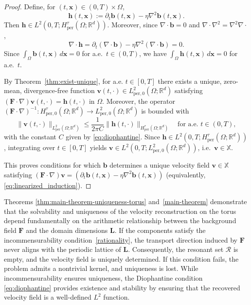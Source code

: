 \documentclass[12pt]{article}
\begin{document}
\begin{proof}
Define, for $(t,\boldsymbol x)\in(0,T)\times\Omega$,
\[
\boldsymbol h(t,\boldsymbol x)
:= \partial_t \boldsymbol b(t,\boldsymbol x)-\eta \nabla^2 \boldsymbol b(t,\boldsymbol x).
\]
Then $\boldsymbol h\in L^2(0,T;H^{\tau}_{\mathrm{per}}(\Omega; \mathbb{R}^d))$. Moreover, since $\nabla\cdot \boldsymbol b=0$ and
$\nabla\cdot\nabla^2=\nabla^2\nabla\cdot$,
\[
\nabla\cdot \boldsymbol h
=\partial_t(\nabla\cdot \boldsymbol b)-\eta \nabla^2(\nabla\cdot \boldsymbol b)=0.
\]
Since $\int_{\Omega}\boldsymbol b(t,\boldsymbol x)\,d\boldsymbol x=0$ for a.e.\ $t\in(0,T)$, we have $\int_{\Omega}\boldsymbol h(t,\boldsymbol x)\,d\boldsymbol x=0$ for a.e.\ $t$.

By Theorem~\ref{thm:exist-unique}, for a.e. $t\in[0,T]$ there exists a unique,
zero-mean, divergence-free function $\boldsymbol v(t,\cdot)\in L^2_{\mathrm{per},0}(\Omega; \mathbb{R}^d)$ satisfying
${{} (\mathbf{F}\cdot\nabla)\boldsymbol v(t,\cdot)=\boldsymbol h(t,\cdot)\textrm{ in }\Omega}$.
Moreover, the operator $(\boldsymbol{F}\cdot \nabla)^{-1}:H^{\tau}_{\textrm{per},0}(\Omega; \mathbb{R}^d)\rightarrow L^2_{\textrm{per},0}(\Omega; \mathbb{R}^d)$ is bounded with
\[
\|\boldsymbol v(t,\cdot)\|_{L^2_{\mathrm{per}}(\Omega; \mathbb{R}^d)} \le \frac{1}{2\pi C} \|\boldsymbol h(t,\cdot)\|_{H^\tau_{\mathrm{per}}(\Omega; \mathbb{R}^d)}
\quad\textrm{for a.e. }t\in(0,T),
\]
with the constant $C$ given by \eqref{eq:diophantine}.
Since $\boldsymbol h\in L^2(0,T;H^\tau_{\mathrm{per}}(\Omega; \mathbb{R}^d))$, integrating over $t\in[0,T]$ yields $\boldsymbol v\in L^2(0,T;L^2_{\mathrm{per},0}(\Omega; \mathbb{R}^d))$,
i.e.\ $\boldsymbol v\in\mathbb X$.

\medskip
This proves conditions for which $\boldsymbol b$ determines a unique velocity field $\boldsymbol v\in\mathbb X$
satisfying ${{} (\mathbf{F}\cdot\nabla)\boldsymbol v = (\partial_t \boldsymbol b(t,\boldsymbol x)-\eta \nabla^2 \boldsymbol b(t,\boldsymbol x))}$ (equivalently, \eqref{eq:linearized_induction}).
\end{proof}


 Theorems \ref{thm:main-theorem-uniqueness-torus} and~\ref{main-theorem} demonstrate that the solvability and uniqueness of the velocity reconstruction on the torus depend fundamentally on the arithmetic relationship between the background field $\mathbf{F}$ and the domain dimensions $\boldsymbol{L}$. If the components satisfy the incommensurability condition~\eqref{rationality}, the transport direction induced by $\mathbf{F}$ never aligns with the periodic lattice of $\boldsymbol{L}$. Consequently, the resonant set $\mathcal{R}$ is empty, and the velocity field is uniquely determined. If this condition fails, the problem admits a nontrivial kernel, and uniqueness is lost. While incommensurability ensures uniqueness, the Diophantine condition \eqref{eq:diophantine} provides existence and stability by ensuring that the recovered velocity field is a well-defined $L^2$ function.
 
\end{document}
